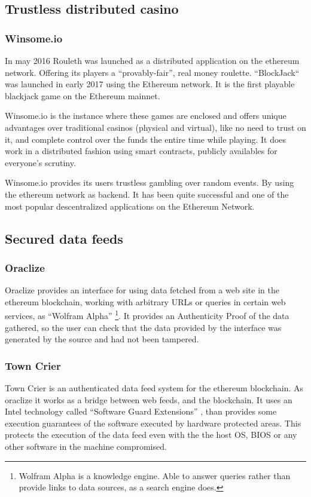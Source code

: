 \subsection{Trustless distributed casino}

\subsubsection{Winsome.io}
In may 2016 Rouleth\cite{winsomeio} was launched as a distributed application
  on the ethereum network. Offering its players a ``provably-fair'', real money
  roulette.
``BlockJack`` was launched in early 2017 using the Ethereum network.
It is the first playable blackjack game on the Ethereum mainnet.

Winsome.io is the instance where these games are enclosed and offers unique
  advantages over traditional casinos (physical and virtual), like no need to
  trust on it, and complete control over the funds the entire time while
  playing.
It does work in a distributed fashion using smart contracts, publicly availables
  for everyone's scrutiny.

Winsome.io provides its users trustless gambling over random events.
By using the ethereum network as backend.
It has been quite successful and one of the most popular descentralized
  applications on the Ethereum Network.

\subsection{Secured data feeds}

\subsubsection{Oraclize}
Oraclize \cite{oraclizeit} provides an interface for using data fetched from a
  web site in the ethereum blockchain, working with arbitrary URLs or queries
  in certain web services, as ``Wolfram Alpha'' \footnote{Wolfram Alpha is a
  knowledge engine. Able to answer queries rather than provide links to data
  sources, as a search engine does.}.
It provides an Authenticity Proof of the data gathered, so the user can check
  that the data provided by the interface was generated by the source and had
  not been tampered.

\subsubsection{Town Crier}
Town Crier\cite{zhang2016town} is an authenticated data feed system for
  the ethereum blockchain.
As oraclize it works as a bridge between web feeds, and the blockchain.
It uses an Intel technology called ``Software Guard Extensions''
  \cite{costan2016intel}, than provides some execution guarantees of the software
  executed by hardware protected areas.
This protects the execution of the data feed even with the the host OS, BIOS or
  any other software in the machine compromised.
